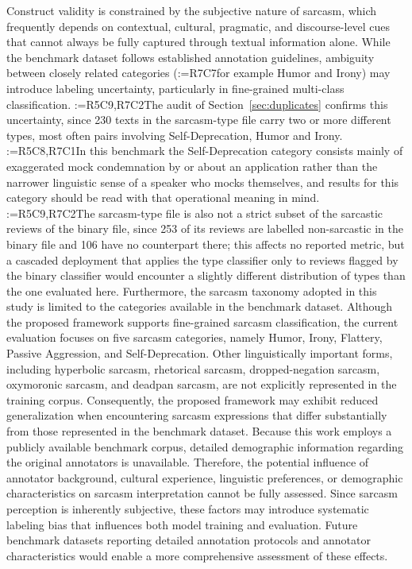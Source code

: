 \documentclass[a4paper,fleqn]{cas-sc}
\makeatletter
\newif\iftracked
\newcommand{\rv@setcolour}[1]{%
  \IfStrEq{#1}{R7C7}{\color{rvEdit}}{%
    \IfSubStr{#1}{R5}{\IfSubStr{#1}{R7}{\color{rvBoth}}{\color{rvFive}}}{\color{rvSeven}}}}
\newcommand{\rv@tag}[1]{\textsuperscript{\sffamily\bfseries\scriptsize[\StrSubstitute{#1}{,}{, }]}\,}
\newcommand{\rv@recordone}[1]{%
  \edef\rv@i{#1}%
  \ifcsdef{rv@n@\rv@i}{}{\csgdef{rv@n@\rv@i}{0}}%
  \csxdef{rv@n@\rv@i}{\the\numexpr\csuse{rv@n@\rv@i}+1\relax}%
  \begingroup\edef\@currentlabel{\rv@i}\label{rv:\rv@i:\csuse{rv@n@\rv@i}}\endgroup}
\newcommand{\rv@record}[1]{\@for\rv@id:=#1\do{\expandafter\rv@recordone\expandafter{\rv@id}}}
\DeclareRobustCommand{\rc}[2]{\rv@record{#1}\iftracked{\rv@setcolour{#1}\rv@tag{#1}#2}\else#2\fi}
\DeclareRobustCommand{\rce}[1]{\rv@record{R7C7}\iftracked{\color{rvEdit}#1}\else#1\fi}
\makeatother
\begin{document}
Construct validity is constrained by the subjective nature of sarcasm, which frequently depends on contextual, cultural, pragmatic, and discourse-level cues that cannot always be fully captured through textual information alone. While the benchmark dataset follows established annotation guidelines, ambiguity between closely related categories (\rce{for example} Humor and Irony) may introduce labeling uncertainty, particularly in fine-grained multi-class classification. \rc{R5C9,R7C2}{The audit of Section~\ref{sec:duplicates} confirms this uncertainty, since 230 texts in the sarcasm-type file carry two or more different types, most often pairs involving Self-Deprecation, Humor and Irony.} \rc{R5C8,R7C1}{In this benchmark the Self-Deprecation category consists mainly of exaggerated mock condemnation by or about an application rather than the narrower linguistic sense of a speaker who mocks themselves, and results for this category should be read with that operational meaning in mind.} \rc{R5C9,R7C2}{The sarcasm-type file is also not a strict subset of the sarcastic reviews of the binary file, since 253 of its reviews are labelled non-sarcastic in the binary file and 106 have no counterpart there; this affects no reported metric, but a cascaded deployment that applies the type classifier only to reviews flagged by the binary classifier would encounter a slightly different distribution of types than the one evaluated here.} Furthermore, the sarcasm taxonomy adopted in this study is limited to the categories available in the benchmark dataset. Although the proposed framework supports fine-grained sarcasm classification, the current evaluation focuses on five sarcasm categories, namely Humor, Irony, Flattery, Passive Aggression, and Self-Deprecation. Other linguistically important forms, including hyperbolic sarcasm, rhetorical sarcasm, dropped-negation sarcasm, oxymoronic sarcasm, and deadpan sarcasm, are not explicitly represented in the training corpus. Consequently, the proposed framework may exhibit reduced generalization when encountering sarcasm expressions that differ substantially from those represented in the benchmark dataset. Because this work employs a publicly available benchmark corpus, detailed demographic information regarding the original annotators is unavailable. Therefore, the potential influence of annotator background, cultural experience, linguistic preferences, or demographic characteristics on sarcasm interpretation cannot be fully assessed. Since sarcasm perception is inherently subjective, these factors may introduce systematic labeling bias that influences both model training and evaluation. Future benchmark datasets reporting detailed annotation protocols and annotator characteristics would enable a more comprehensive assessment of these effects.
\end{document}

